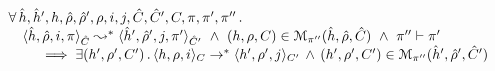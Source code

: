 \begin{lemma}\label{lemma:full:soundness}
$$
\begin{array}{l}
\forall \, \sheap, \sheap', \heap, \sstore, \sstore', \store, i, j, \sctx, \sctx', \ctx, \pc, \pc', \pc'' \, . \,  \\ 
%
\quad \symbtranstrans{\sheap, \sstore, i, \pc}{\sheap', \sstore', j, \pc'}[\sctx][\sctx'] 
   \ \wedge \ 
      (\heap, \store, \ctx) \in \smodels{\sheap, \sstore, \sctx}{\pc''}  
           \ \wedge \  \pc'' \vdash \pc'   \\ \quad \quad
      	 \ \implies \exists (\heap', \store', \ctx') \, . \, 
	 	 \semtranstrans{\heap, \store, i}{\heap', \store', j}[\ctx][\ctx']
		\, \wedge \, 
		(\heap', \store', \ctx') \in \smodels{\sheap', \sstore', \sctx'}{\pc''}  
\end{array}
$$
\end{lemma}
